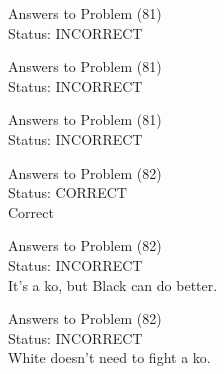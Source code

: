 \documentclass[11pt]{article}
\begin{document}
\begin{minipage}[t]{0.5\textwidth}
  {\centering
  
  Answers to Problem (81)\\
  Status: INCORRECT\\
  
  }
\end{minipage}
\begin{minipage}[t]{0.5\textwidth}
  {\centering
  
  Answers to Problem (81)\\
  Status: INCORRECT\\
  
  }
\end{minipage}
\begin{minipage}[t]{0.5\textwidth}
  {\centering
  
  Answers to Problem (81)\\
  Status: INCORRECT\\
  
  }
\end{minipage}
\begin{minipage}[t]{0.5\textwidth}
  {\centering
  
  Answers to Problem (82)\\
  Status: CORRECT\\
  Correct\\
  }
\end{minipage}
\begin{minipage}[t]{0.5\textwidth}
  {\centering
  
  Answers to Problem (82)\\
  Status: INCORRECT\\
  It's a ko, but Black can do better.\\
  }
\end{minipage}
\begin{minipage}[t]{0.5\textwidth}
  {\centering
  
  Answers to Problem (82)\\
  Status: INCORRECT\\
  White doesn't need to fight a ko.\\
  }
\end{minipage}
\end{document}
